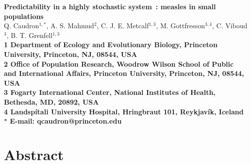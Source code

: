 \documentclass[10pt]{article}
\date{}
\begin{document}
\begin{flushleft}
{\Large
\textbf{Predictability in a highly stochastic system~: measles in small populations}
}
\\
Q. Caudron$^{1,\ast}$, 
A. S. Mahmud$^{2}$, 
C. J. E. Metcalf$^{1,3}$,
M. Gottfre{\dh}sson$^{3,4}$,
C. Viboud$^{3}$,
B. T. Grenfell$^{1,3}$
\\
\bf{1} Department of Ecology and Evolutionary Biology, Princeton University, Princeton, NJ, 08544, USA
\\
\bf{2} Office of Population Research, Woodrow Wilson School of Public and International Affairs, Princeton University, Princeton, NJ, 08544, USA
\\
\bf{3} Fogarty International Center, National Institutes of Health, Bethesda, MD, 20892, USA
\\
\bf{4} Landsp\'{i}tali University Hospital, Hringbraut 101, Reykjav\'{i}k, Iceland
\\
$\ast$ E-mail: qcaudron@princeton.edu
\end{flushleft}













\section*{Abstract}
\end{document}
